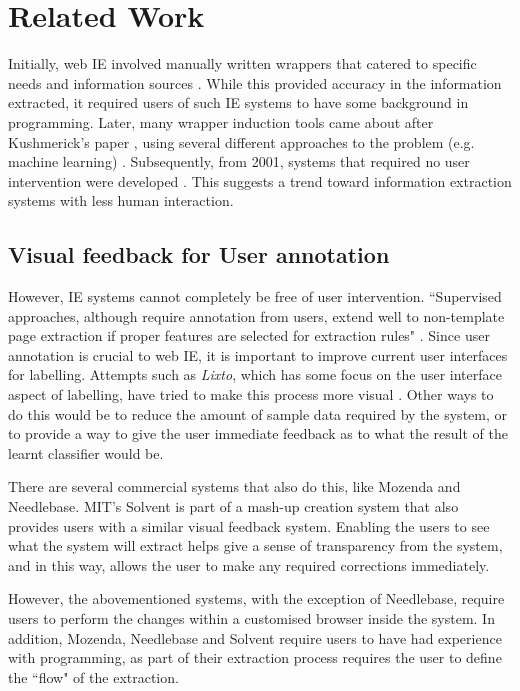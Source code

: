 \chapter{Related Work}
\label{chap:relatedwork}
Initially, web IE involved manually written wrappers that catered to specific needs and
information sources \cite{Chawathe1994,Perkowitz1995}. While this provided accuracy in the
information extracted, it required users of such IE systems to have some background in
programming. Later, many wrapper induction tools came about after Kushmerick's paper
\cite{Kushmerick1997}, using several different approaches to the problem (e.g. machine
learning) \cite{Freitag1998,Soderland}. Subsequently, from 2001, systems that required no user
intervention were developed \cite{Chang2001,Crescenzi2002,Arasu2003}. This suggests a trend
toward information extraction systems with less human interaction.
\section{Visual feedback for User annotation}
However, IE systems cannot completely be free of user intervention. ``Supervised approaches,
although require annotation from users, extend well to non-template page extraction if proper
features are selected for extraction rules" \cite{Kayed2006}. Since user annotation is crucial
to web IE, it is important to improve current user interfaces for labelling. Attempts such as
\textit{Lixto}, which has some focus on the user interface aspect of labelling, have tried to
make this process more visual \cite{Baumgartner2001}. Other ways to do this would be to reduce
the amount of sample data required by the system, or to provide a way to give the user
immediate feedback as to what the result of the learnt classifier would be.

There are several commercial systems that also do this, like Mozenda and Needlebase. %
MIT's Solvent is part of a mash-up creation system that also provides users with a similar
visual feedback system. Enabling the users to see what the system will extract helps give a
sense of transparency from the system, and in this way, allows the user to make any required
corrections immediately.

However, the abovementioned systems, with the exception of Needlebase, require users to perform
the changes within a customised browser inside the system. In addition, Mozenda, Needlebase and
Solvent require users to have had experience with programming, as part of their extraction
process requires the user to define the ``flow" of the extraction.

